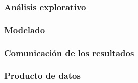 \subsubsection{Análisis explorativo}
\label{subsec:state_dataScience_workflow_2}

\subsubsection{Modelado}
\label{subsec:state_dataScience_workflow_modeling}

\subsubsection{Comunicación de los resultados}
\label{subsec:state_dataScience_workflow_communication}

\subsubsection{Producto de datos}
\label{subsec:state_dataScience_workflow_dataProduct}





